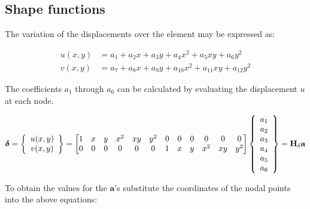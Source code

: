 \subsection{Shape functions}
The variation of the displacements over the element may be expressed as:

\begin{equation}
\begin{split}
u(x,y) &= a_1 + a_2 x + a_3 y + a_4 x^2 + a_5 x y + a_6 y^2 \\
v(x,y) &= a_7 + a_8 x + a_9 y + a_{10} x^2 + a_{11} x y + a_{12} y^2
\end{split}
\end{equation}

The coefficients $ a_1 $ through $ a_6 $ can be calculated by evaluating the displacement $ u $ at each node.

\begin{equation} \setcounter{MaxMatrixCols}{12}
\boldsymbol{\delta} = \left\lbrace \begin{array}{c}
u(x,y) \\ 
v(x,y)
\end{array} \right \rbrace  = \begin{bmatrix}
1 & x & y & x^2 & xy & y^2 & 0 & 0 & 0 & 0 & 0 & 0 \\ 
0 & 0 & 0 & 0 & 0 & 0 & 1 & x & y & x^2 & xy & y^2
\end{bmatrix} \left\lbrace \begin{array}{c}
a_1 \\ 
a_2 \\ 
a_3 \\ 
a_4 \\ 
a_5 \\ 
a_6
\end{array} \right \rbrace = \mathbf{H}_\delta \mathbf{a}
\end{equation}

To obtain the values for the $ \mathbf{a} $'s substitute the coordinates of the nodal points into the above equations:

